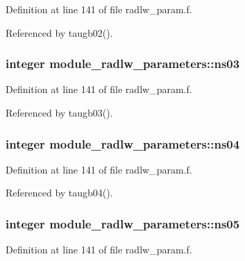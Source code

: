Definition at line 141 of file radlw\+\_\+param.\+f.



Referenced by taugb02().

\subsubsection[{\texorpdfstring{ns03}{ns03}}]{\setlength{\rightskip}{0pt plus 5cm}integer module\+\_\+radlw\+\_\+parameters\+::ns03}\hypertarget{group__module__radlw__main_ga987d257f8e2f0743e92055be94424401}{}\label{group__module__radlw__main_ga987d257f8e2f0743e92055be94424401}


Definition at line 141 of file radlw\+\_\+param.\+f.



Referenced by taugb03().

\subsubsection[{\texorpdfstring{ns04}{ns04}}]{\setlength{\rightskip}{0pt plus 5cm}integer module\+\_\+radlw\+\_\+parameters\+::ns04}\hypertarget{group__module__radlw__main_ga57f85389c924ba16fad61578170eadcc}{}\label{group__module__radlw__main_ga57f85389c924ba16fad61578170eadcc}


Definition at line 141 of file radlw\+\_\+param.\+f.



Referenced by taugb04().

\subsubsection[{\texorpdfstring{ns05}{ns05}}]{\setlength{\rightskip}{0pt plus 5cm}integer module\+\_\+radlw\+\_\+parameters\+::ns05}\hypertarget{group__module__radlw__main_ga6bb5413129239f08596d4e7233c666a5}{}\label{group__module__radlw__main_ga6bb5413129239f08596d4e7233c666a5}


Definition at line 141 of file radlw\+\_\+param.\+f.



